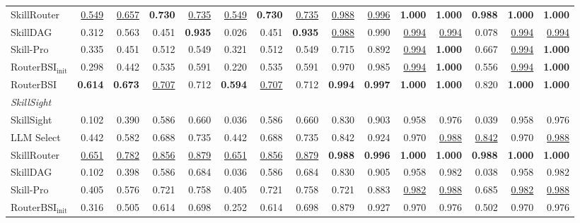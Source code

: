 \begin{table}[t]
\begin{tabular*}{\textwidth}{@{\extracolsep{\fill}}lrrrrrrrrrrrrrr@{}}
SkillRouter & \underline{0.549} & \underline{0.657} & \textbf{0.730} & \underline{0.735} & \underline{0.549} & \textbf{0.730} & \underline{0.735} & \underline{0.988} & \underline{0.996} & \textbf{1.000} & \textbf{1.000} & \textbf{0.988} & \textbf{1.000} & \textbf{1.000} \\
SkillDAG & 0.312 & 0.563 & 0.451 & \textbf{0.935} & 0.026 & 0.451 & \textbf{0.935} & \underline{0.988} & 0.990 & \underline{0.994} & \underline{0.994} & 0.078 & \underline{0.994} & \underline{0.994} \\
Skill-Pro & 0.335 & 0.451 & 0.512 & 0.549 & 0.321 & 0.512 & 0.549 & 0.715 & 0.892 & \underline{0.994} & \textbf{1.000} & 0.667 & \underline{0.994} & \textbf{1.000} \\
$\mathrm{RouterBSI}_{\mathrm{init}}$ & 0.298 & 0.442 & 0.535 & 0.591 & 0.220 & 0.535 & 0.591 & 0.970 & 0.985 & \underline{0.994} & \textbf{1.000} & 0.556 & \underline{0.994} & \textbf{1.000} \\
RouterBSI & \textbf{0.614} & \textbf{0.673} & \underline{0.707} & 0.712 & \textbf{0.594} & \underline{0.707} & 0.712 & \textbf{0.994} & \textbf{0.997} & \textbf{1.000} & \textbf{1.000} & 0.820 & \textbf{1.000} & \textbf{1.000} \\
\midrule
\multicolumn{15}{l}{\textit{SkillSight}} \\
\midrule
SkillSight & 0.102 & 0.390 & 0.586 & 0.660 & 0.036 & 0.586 & 0.660 & 0.830 & 0.903 & 0.958 & 0.976 & 0.039 & 0.958 & 0.976 \\
LLM Select & 0.442 & 0.582 & 0.688 & 0.735 & 0.442 & 0.688 & 0.735 & 0.842 & 0.924 & 0.970 & \underline{0.988} & \underline{0.842} & 0.970 & \underline{0.988} \\
SkillRouter & \underline{0.651} & \underline{0.782} & \underline{0.856} & \underline{0.879} & \underline{0.651} & \underline{0.856} & \underline{0.879} & \textbf{0.988} & \textbf{0.996} & \textbf{1.000} & \textbf{1.000} & \textbf{0.988} & \textbf{1.000} & \textbf{1.000} \\
SkillDAG & 0.102 & 0.398 & 0.586 & 0.684 & 0.036 & 0.586 & 0.684 & 0.830 & 0.905 & 0.958 & 0.982 & 0.038 & 0.958 & 0.982 \\
Skill-Pro & 0.405 & 0.576 & 0.721 & 0.758 & 0.405 & 0.721 & 0.758 & 0.721 & 0.883 & \underline{0.982} & \underline{0.988} & 0.685 & \underline{0.982} & \underline{0.988} \\
$\mathrm{RouterBSI}_{\mathrm{init}}$ & 0.316 & 0.505 & 0.614 & 0.698 & 0.252 & 0.614 & 0.698 & 0.879 & 0.927 & 0.970 & 0.976 & 0.502 & 0.970 & 0.976 \\

\end{tabular*}
\end{table}
